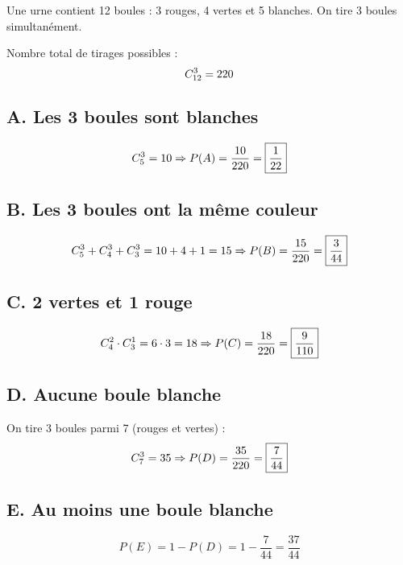 \documentclass[12pt,a4paper]{article}
\begin{document}
Une urne contient 12 boules : 3 rouges, 4 vertes et 5 blanches.  
On tire 3 boules simultanément.

Nombre total de tirages possibles :
\[
C_{12}^{3} = 220
\]

\subsection*{A. Les 3 boules sont blanches}

\[
C_{5}^{3} = 10 \Rightarrow P(A) = \frac{10}{220} = \boxed{\frac{1}{22}}
\]

\subsection*{B. Les 3 boules ont la même couleur}

\[
C_{5}^{3} + C_{4}^{3} + C_{3}^{3} = 10 + 4 + 1 = 15
\Rightarrow P(B) = \frac{15}{220} = \boxed{\frac{3}{44}}
\]

\subsection*{C. 2 vertes et 1 rouge}

\[
C_{4}^{2} \cdot C_{3}^{1} = 6 \cdot 3 = 18
\Rightarrow P(C) = \frac{18}{220} = \boxed{\frac{9}{110}}
\]

\subsection*{D. Aucune boule blanche}

On tire 3 boules parmi 7 (rouges et vertes) :
\[
C_{7}^{3} = 35 \Rightarrow P(D) = \frac{35}{220} = \boxed{\frac{7}{44}}
\]

\subsection*{E. Au moins une boule blanche}

\[
P(E) = 1 - P(D) = 1 - \frac{7}{44} = \boxed{\frac{37}{44}}
\]
\end{document}
